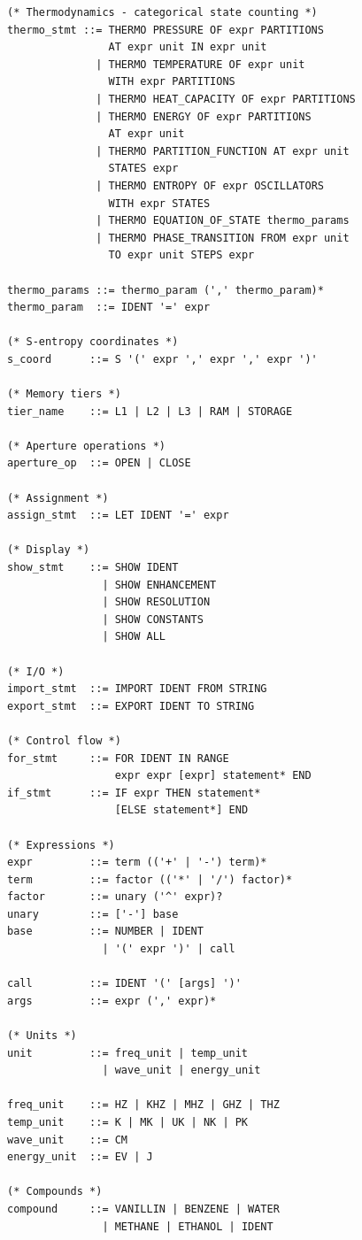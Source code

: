 \documentclass[twocolumn,10pt]{article}
\begin{document}
\begin{verbatim}
(* Thermodynamics - categorical state counting *)
thermo_stmt ::= THERMO PRESSURE OF expr PARTITIONS
                AT expr unit IN expr unit
              | THERMO TEMPERATURE OF expr unit
                WITH expr PARTITIONS
              | THERMO HEAT_CAPACITY OF expr PARTITIONS
              | THERMO ENERGY OF expr PARTITIONS
                AT expr unit
              | THERMO PARTITION_FUNCTION AT expr unit
                STATES expr
              | THERMO ENTROPY OF expr OSCILLATORS
                WITH expr STATES
              | THERMO EQUATION_OF_STATE thermo_params
              | THERMO PHASE_TRANSITION FROM expr unit
                TO expr unit STEPS expr

thermo_params ::= thermo_param (',' thermo_param)*
thermo_param  ::= IDENT '=' expr

(* S-entropy coordinates *)
s_coord      ::= S '(' expr ',' expr ',' expr ')'

(* Memory tiers *)
tier_name    ::= L1 | L2 | L3 | RAM | STORAGE

(* Aperture operations *)
aperture_op  ::= OPEN | CLOSE

(* Assignment *)
assign_stmt  ::= LET IDENT '=' expr

(* Display *)
show_stmt    ::= SHOW IDENT
               | SHOW ENHANCEMENT
               | SHOW RESOLUTION
               | SHOW CONSTANTS
               | SHOW ALL

(* I/O *)
import_stmt  ::= IMPORT IDENT FROM STRING
export_stmt  ::= EXPORT IDENT TO STRING

(* Control flow *)
for_stmt     ::= FOR IDENT IN RANGE
                 expr expr [expr] statement* END
if_stmt      ::= IF expr THEN statement*
                 [ELSE statement*] END

(* Expressions *)
expr         ::= term (('+' | '-') term)*
term         ::= factor (('*' | '/') factor)*
factor       ::= unary ('^' expr)?
unary        ::= ['-'] base
base         ::= NUMBER | IDENT
               | '(' expr ')' | call

call         ::= IDENT '(' [args] ')'
args         ::= expr (',' expr)*

(* Units *)
unit         ::= freq_unit | temp_unit
               | wave_unit | energy_unit

freq_unit    ::= HZ | KHZ | MHZ | GHZ | THZ
temp_unit    ::= K | MK | UK | NK | PK
wave_unit    ::= CM
energy_unit  ::= EV | J

(* Compounds *)
compound     ::= VANILLIN | BENZENE | WATER
               | METHANE | ETHANOL | IDENT
\end{verbatim}
\end{document}
